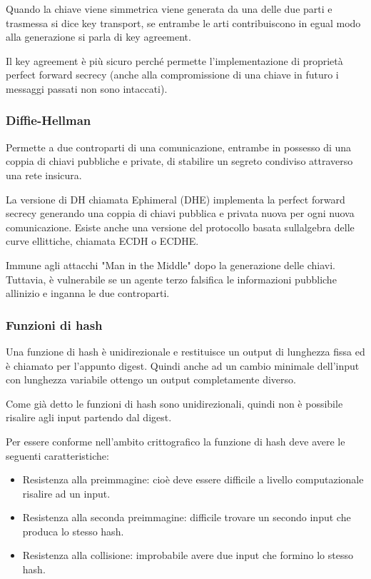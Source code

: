 Quando la chiave viene simmetrica viene generata da una delle due parti
e trasmessa si dice key transport, se entrambe le arti contribuiscono in
egual modo alla generazione si parla di key agreement.

Il key agreement è più sicuro perché permette l'implementazione di
proprietà perfect forward secrecy (anche alla compromissione di una
chiave in futuro i messaggi passati non sono intaccati).

\subsubsection{Diffie-Hellman}\label{diffie-hellman}

Permette a due controparti di una comunicazione, entrambe in possesso di
una coppia di chiavi pubbliche e private, di stabilire un segreto
condiviso attraverso una rete insicura.

La versione di DH chiamata Ephimeral (DHE) implementa la perfect forward
secrecy generando una coppia di chiavi pubblica e privata nuova per ogni
nuova comunicazione. Esiste anche una versione del protocollo basata
sull\textquotesingle algebra delle curve ellittiche, chiamata ECDH o
ECDHE.

Immune agli attacchi "Man in the Middle" dopo la generazione delle
chiavi. Tuttavia, è vulnerabile se un agente terzo falsifica le
informazioni pubbliche all\textquotesingle inizio e inganna le due
controparti.

\subsubsection{Funzioni di hash}\label{funzioni-di-hash}

Una funzione di hash è unidirezionale e restituisce un output di
lunghezza fissa ed è chiamato per l'appunto digest. Quindi anche ad un
cambio minimale dell'input con lunghezza variabile ottengo un output
completamente diverso.

Come già detto le funzioni di hash sono unidirezionali, quindi non è
possibile risalire agli input partendo dal digest.

Per essere conforme nell'ambito crittografico la funzione di hash deve
avere le seguenti caratteristiche:

\begin{itemize}
\item
  Resistenza alla preimmagine: cioè deve essere difficile a livello
  computazionale risalire ad un input.
\item
  Resistenza alla seconda preimmagine: difficile trovare un secondo
  input che produca lo stesso hash.
\item
  Resistenza alla collisione: improbabile avere due input che formino lo
  stesso hash.
\end{itemize}


